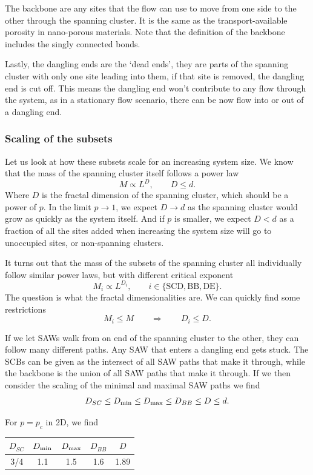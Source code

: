 \documentclass[a4paper, 11pt, notitlepage, english]{article}
\newcommand{\To}{\quad\Rightarrow\quad}
\begin{document}
The backbone are any sites that the flow can use to move from one side to the other through the spanning cluster. It is the same as the transport-available porosity in nano-porous materials. Note that the definition of the backbone includes the singly connected bonds.

Lastly, the dangling ends are the `dead ends', they are parts of the spanning cluster with only one site leading into them, if that site is removed, the dangling end is cut off. This means the dangling end won't contribute to any flow through the system, as in a stationary flow scenario, there can be now flow into or out of a dangling end.

\subsubsection*{Scaling of the subsets}

Let us look at how these subsets scale for an increasing system size. We know that the mass of the spanning cluster itself follows a power law
$$M \propto L^D, \qquad D \leq d.$$
Where $D$ is the fractal dimension of the spanning cluster, which should be a power of $p$. In the limit $p\to 1$, we expect $D \to d$ as the spanning cluster would grow as quickly as the system itself. And if $p$ is smaller, we expect $D < d$ as a fraction of all the sites added when increasing the system size will go to unoccupied sites, or non-spanning clusters.

It turns out that the mass of the subsets of the spanning cluster all individually follow similar power laws, but with different critical exponent
$$M_i \propto L^{D_i}, \qquad i \in \{\mbox{SCD}, \mbox{BB}, \mbox{DE}\}.$$
The question is what the fractal dimensionalities are. We can quickly find some restrictions
$$M_i \leq M \quad \To \quad D_i \leq D.$$

If we let SAWs walk from on end of the spanning cluster to the other, they can follow many different paths. Any SAW that enters a dangling end gets stuck. The SCBs can be given as the intersect of all SAW paths that make it through, while the backbone is the union of all SAW paths that make it through. If we then consider the scaling of the minimal and maximal SAW paths we find
$$D_{SC} \leq D_{\rm min} \leq D_{\rm max} \leq D_{BB} \leq D \leq d.$$

For $p=p_c$ in 2D, we find

\begin{center}
\begin{tabular}{c c c c c}
$D_{SC}$ & $D_{\rm min}$ & $D_{\rm max}$ & $D_{BB}$ & $D$ \\ \hline
3/4	& 1.1 & 1.5 & 1.6 & 1.89
\end{tabular}
\end{center}
\end{document}
